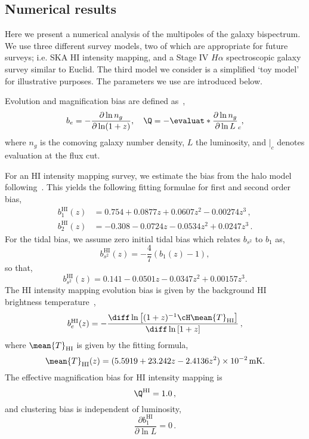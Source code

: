 {\subsection{Numerical results}

Here we present a numerical analysis of the multipoles of the galaxy bispectrum. We use three different survey models, two of which are appropriate for future surveys; i.e. SKA HI intensity mapping, and a Stage IV \(H\alpha\) spectroscopic galaxy survey similar to Euclid. The third model we consider is a simplified `toy model' for illustrative purposes. The parameters we use are introduced below. 

Evolution and magnification bias are defined as~\cite{Alonso_2015}, 
\begin{equation}\label{eq:beQdefs}
	b_e = - \frac{\partial \ln n_g}{\partial \ln(1+z)}, \quad \Q = - \evaluat*{\frac{\partial\ln n_g}{\partial \ln L}}_{c},
\end{equation}
where \(n_g\) is the comoving galaxy number density, \(L\) the luminosity, and \(|_c\) denotes evaluation at the flux cut. 

For an HI intensity mapping survey, we estimate the bias from the halo model following~\cite{Umeh:2015gza}.  
This yields the following fitting formulae for first and second order bias, 
\begin{align}
	b^{\mathrm{HI}}_1(z) &=    0.754 + 0.0877 z + 0.0607 z^2 - 0.00274 z^3 \,, \\ 
	b^{\mathrm{HI}}_2(z) &=  -0.308 - 0.0724 z - 0.0534 z^2 + 0.0247 z^3  \,.
\end{align}
For the tidal bias, we assume zero initial tidal bias which relates \(b_{s^2}\) to \(b_1\) as,
\begin{equation}
	b_{s^2}^{\mathrm{HI}}(z) = - \frac{4}{7} (b_1(z) -1),
\end{equation}
so that, 
\begin{equation}
	b_{s^2}^{\mathrm{HI}}(z) = 0.141 - 0.0501 z - 0.0347 z^2 + 0.00157 z^3.
\end{equation}
The HI intensity mapping evolution bias is given by the background HI brightness temperature~\cite{Fonseca:2018hsu},
\begin{equation}
	b_e^{\mathrm{HI}}(z) = - \frac{\diff \ln \left[ (1+z)^{-1} \cH \mean{T}_{\mathrm{HI}}\right]}{\diff \ln\left[1+z \right]}\,,
\end{equation}
where \(\mean{T}_{\mathrm{HI}}\) is given by the fitting formula, 
\begin{equation}
	\mean{T}_{\mathrm{HI}}(z) = (5.5919 + 23.242  z - 2.4136  z^2)\times 10^{-2} \, \mathrm{mK}.
\end{equation}
The effective magnification bias for HI intensity mapping is~\cite{Fonseca:2018hsu}
\begin{equation}
	\Q^{\mathrm{HI}} = 1.0\,,
\end{equation}
and clustering bias is independent of luminosity, 
\begin{equation}
	\frac{\partial b_1^\mathrm{HI}}{\partial \ln L} = 0\,.
\end{equation}

}
